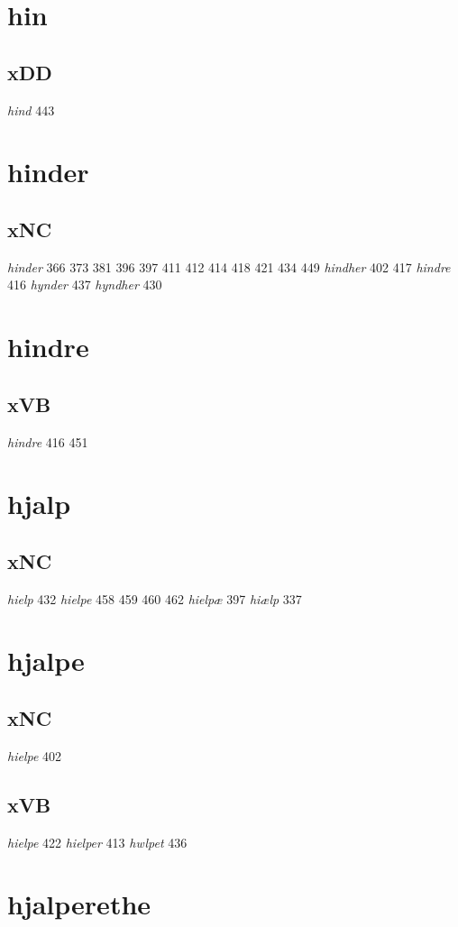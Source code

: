 \documentclass[a4paper,twocolumn]{article}
\begin{document}
\section{hin}
\label{sec:org7a3cf83}
\subsection{xDD}
\label{sec:org3355971}
\emph{hind} 443 
\section{hinder}
\label{sec:org8a01276}
\subsection{xNC}
\label{sec:orge366799}
\emph{hinder} 366 373 381 396 397 411 412 414 418 421 434 449 \emph{hindher} 402 417 \emph{hindre} 416 \emph{hynder} 437 \emph{hyndher} 430 
\section{hindre}
\label{sec:org38cb88b}
\subsection{xVB}
\label{sec:org2c3a9dc}
\emph{hindre} 416 451 
\section{hjalp}
\label{sec:org2f015ca}
\subsection{xNC}
\label{sec:orga665563}
\emph{hielp} 432 \emph{hielpe} 458 459 460 462 \emph{hielpæ} 397 \emph{hiælp} 337 
\section{hjalpe}
\label{sec:orge4ad7e2}
\subsection{xNC}
\label{sec:org41b4929}
\emph{hielpe} 402 
\subsection{xVB}
\label{sec:org858b0fe}
\emph{hielpe} 422 \emph{hielper} 413 \emph{hwlpet} 436 
\section{hjalperethe}
\label{sec:orgb2d9f4c}
\end{document}

